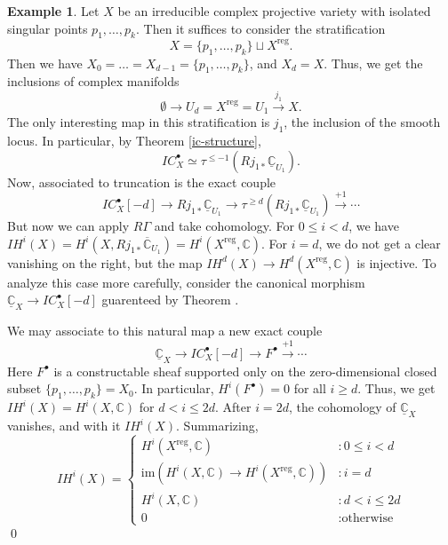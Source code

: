 \documentclass[12pt]{amsart}
\newcommand{\C}{\mathbb{C}}
\theoremstyle{definition}
\newtheorem{example}[theorem]{Example}
\theoremstyle{remark}
\numberwithin{equation}{section}
\begin{document}
\begin{example}
Let $X$ be an irreducible complex projective variety with isolated singular points $p_1,\dots, p_k$. Then it suffices to consider the stratification
\[ X = \{p_1,\dots,p_k\} \sqcup X^{\text{reg}}. \]
Then we have \(X_0 = \dots = X_{d-1} = \{p_1,\dots, p_k\}\), and \(X_d = X\). Thus, we get the inclusions of complex manifolds
\[ \emptyset \to U_d = X^{\text{reg}} = U_1 \overset{j_1}{\to} X.\]
The only interesting map in this stratification is $j_1$, the inclusion of the smooth locus. In particular, by Theorem \ref{ic-structure},
\[ IC_X^\bullet \simeq \tau^{\leq -1}\left(Rj_{1*} \underline{\C}_{U_1}\right). \] 
Now, associated to truncation is the exact couple
\begin{equation}
    IC_X^\bullet[-d] \to Rj_{1*} \underline{\C}_{U_1} \to 
    \tau^{\geq d}\left(Rj_{1*} \underline{\C}_{U_1}\right) \overset{+1}{\to} \cdots
\end{equation}
But now we can apply $R\Gamma$ and take cohomology. For $0 \leq i < d$, we have
\( IH^i(X) = H^i(X, Rj_{1*}\overline{\C}_{U_1}) = H^i(X^{\text{reg}}, \C). \) For $i=d$, we do not get a clear vanishing on the right, but the map
\(IH^d(X) \to H^d(X^{\text{reg}}, \C)\) is injective. To analyze this case more carefully, consider the canonical morphism
\( \underline{\C}_X \to IC_X^\bullet[-d] \)
guarenteed by Theorem .

We may associate to this natural map a new exact couple
\begin{equation}
    \underline{\C}_X \to IC_X^\bullet[-d] \to F^\bullet \overset{+1}{\to} \cdots
\end{equation}
Here \(F^\bullet\) is a constructable sheaf supported only on the zero-dimensional closed subset $\{p_1, \dots, p_k\} = X_0$. In particular, \(H^i(F^\bullet) = 0\) for all $i \geq d$. Thus, we get \(IH^i(X) = H^i(X, \C)\) for $d < i \leq 2d$. After $i = 2d$, the cohomology of $\underline{\C}_X$ vanishes, and with it $IH^i(X)$. Summarizing,
\begin{equation}
    IH^i(X) = \begin{cases}
        H^i(X^{\text{reg}}, \C) & : 0 \leq i < d \\
        \text{im}(H^i(X, \C) \to H^i(X^{\text{reg}}, \C)) & : i = d \\
        H^i(X, \C) & : d < i \leq 2d \\
        0 & : \text{otherwise}
    \end{cases}
\end{equation}
\qed
\end{example}
\end{document}
